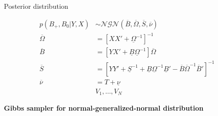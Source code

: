 \documentclass[notes,blackandwhite,mathsans,usenames,dvipsnames]{beamer}
\begin{document}
\begin{frame}{Posterior distribution}

\begin{align*}
p(B_+,B_0|Y,X)&\sim\mathcal{NGN}\left( \overline{B}, \overline{\Omega}, \overline{S} , \overline{\nu}  \right)\\[2ex]
\overline{\Omega} &= \left[XX'  + \underline{\Omega}^{-1} \right]^{-1} \\
\overline{B} &= \left[YX' +\underline{B}\underline{\Omega}^{-1}\right]\overline{\Omega} \\
\overline{S} &= \left[ YY' + \underline{S}^{-1} + \underline{B}\underline{\Omega}^{-1}\underline{B}' - \overline{B}\overline{\Omega}^{-1}\overline{B}' \right]^{-1}\\
\overline{\nu} &= T + \underline{\nu}\\[2ex]
&V_1, \dots, V_N
\end{align*}
\end{frame}







{
\begin{frame}

\begin{adjustwidth}{-0.5cm}{0cm}
\vspace{8.3cm}\large
\textbf{{\color{mcxs1}Gibbs sampler} {\color{mcxs4}for normal-generalized-normal distribution}}
\end{adjustwidth}

\end{frame}
}
\end{document}
